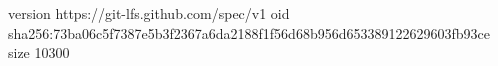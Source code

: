 version https://git-lfs.github.com/spec/v1
oid sha256:73ba06c5f7387e5b3f2367a6da2188f1f56d68b956d653389122629603fb93ce
size 10300
